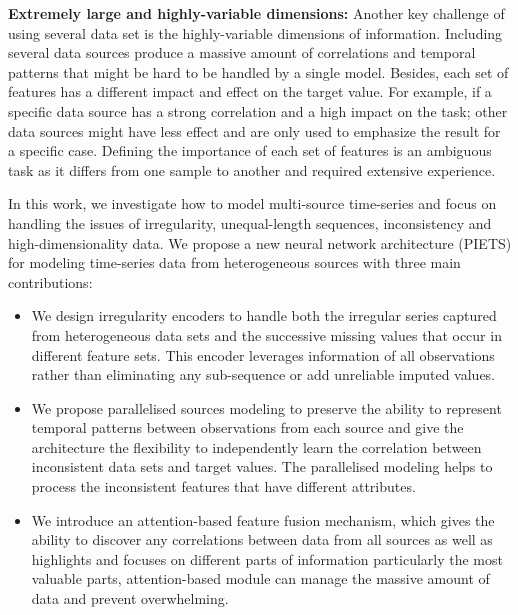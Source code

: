 \documentclass[conference]{IEEEtran}
\begin{document}
\textbf{Extremely large and highly-variable dimensions:} 
Another key challenge of using several data set is the highly-variable dimensions of information. Including several data sources produce a massive amount of correlations and temporal patterns that might be hard to be handled by a single model. Besides, each set of features has a different impact and effect on the target value.  For example, if a specific data source has a strong correlation and a high impact on the task; other data sources might have less effect and are only used to emphasize the result for a specific case. Defining the importance of each set of features is an ambiguous task as it  differs from one sample to another and required extensive experience.


In this work, we investigate how to model multi-source time-series and focus on handling the issues of irregularity,  unequal-length sequences, inconsistency and high-dimensionality data. We propose a new neural network architecture (PIETS) for modeling time-series data from heterogeneous sources with three main contributions:
\begin{itemize}
\item We design irregularity encoders to handle both the irregular series captured from heterogeneous data sets and the successive missing values that occur in different feature sets. This encoder leverages information of all observations rather than eliminating any sub-sequence or add unreliable imputed values.
\item We propose parallelised sources modeling to preserve the ability to represent temporal patterns between observations from each source and give the architecture the flexibility to independently learn the correlation between inconsistent data sets and target values. The parallelised modeling helps to process the inconsistent features that have different attributes.
\item We introduce an attention-based feature fusion mechanism, which gives the ability to discover any correlations between data from all sources as well as highlights and focuses on different parts of information particularly the most valuable parts, attention-based module can manage the massive amount of data and prevent overwhelming.
\end{itemize}




 
\end{document}
